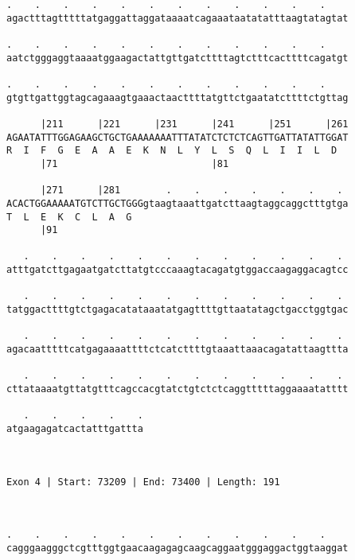\documentclass{article}
\begin{document}
\begin{Verbatim}
.    .    .    .    .    .    .    .    .    .    .    .    
agactttagtttttatgaggattaggataaaatcagaaataatatatttaagtatagtat
                                                            
.    .    .    .    .    .    .    .    .    .    .    .    
aatctgggaggtaaaatggaagactattgttgatcttttagtctttcacttttcagatgt
                                                            
.    .    .    .    .    .    .    .    .    .    .    .    
gtgttgattggtagcagaaagtgaaactaacttttatgttctgaatatcttttctgttag
                                                            
      |211      |221      |231      |241      |251      |261
AGAATATTTGGAGAAGCTGCTGAAAAAAATTTATATCTCTCTCAGTTGATTATATTGGAT
R  I  F  G  E  A  A  E  K  N  L  Y  L  S  Q  L  I  I  L  D  
      |71                           |81                     
  
      |271      |281        .    .    .    .    .    .    . 
ACACTGGAAAAATGTCTTGCTGGGgtaagtaaattgatcttaagtaggcaggctttgtga
T  L  E  K  C  L  A  G                                      
      |91                                                   
  
   .    .    .    .    .    .    .    .    .    .    .    . 
atttgatcttgagaatgatcttatgtcccaaagtacagatgtggaccaagaggacagtcc
                                                            
   .    .    .    .    .    .    .    .    .    .    .    . 
tatggacttttgtctgagacatataaatatgagttttgttaatatagctgacctggtgac
                                                            
   .    .    .    .    .    .    .    .    .    .    .    . 
agacaatttttcatgagaaaattttctcatcttttgtaaattaaacagatattaagttta
                                                            
   .    .    .    .    .    .    .    .    .    .    .    . 
cttataaaatgttatgtttcagccacgtatctgtctctcaggtttttaggaaaatatttt
                                                            
   .    .    .    .    .
atgaagagatcactatttgattta
                        
                        
 
Exon 4 | Start: 73209 | End: 73400 | Length: 191



.    .    .    .    .    .    .    .    .    .    .    .    
cagggaagggctcgtttggtgaacaagagagcaagcaggaatgggaggactggtaaggat
                                                            

\end{Verbatim}
\end{document}
